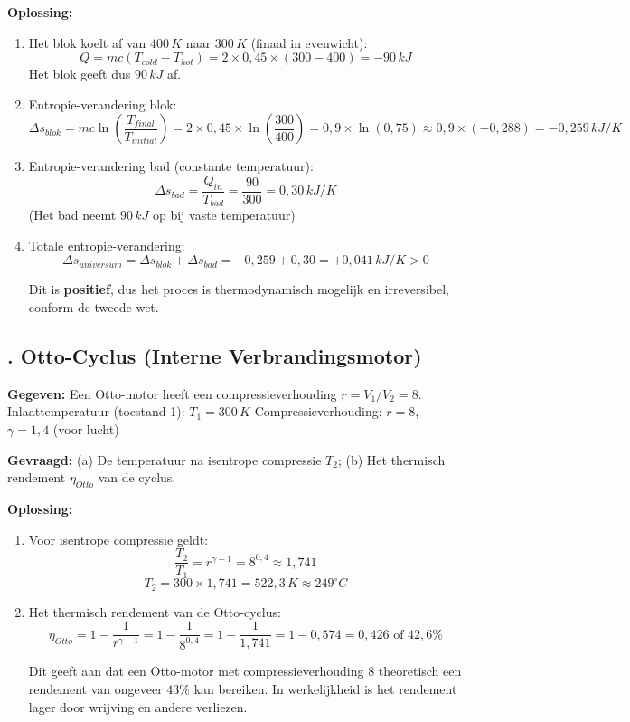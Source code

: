 \documentclass[a4paper,11pt,twoside]{report}
\newcounter{opgave}[section]
\newcommand{\opgave}[1]{%
    \refstepcounter{opgave}%
    \subsection*{\textbf{\arabic{opgave}.} #1}%
}
\begin{document}
\textbf{Oplossing:}
\begin{enumerate}
    \item Het blok koelt af van $400 \, K$ naar $300 \, K$ (finaal in evenwicht):
    \[ Q = m c (T_{cold} - T_{hot}) = 2 \times 0,45 \times (300 - 400) = -90 \, kJ \]
    Het blok geeft dus $90 \, kJ$ af.
    
    \item Entropie-verandering blok:
    \[ \Delta s_{blok} = m c \ln\left(\frac{T_{final}}{T_{initial}}\right) = 2 \times 0,45 \times \ln\left(\frac{300}{400}\right) = 0,9 \times \ln(0,75) \approx 0,9 \times (-0,288) = -0,259 \, kJ/K \]
    
    \item Entropie-verandering bad (constante temperatuur):
    \[ \Delta s_{bad} = \frac{Q_{in}}{T_{bad}} = \frac{90}{300} = 0,30 \, kJ/K \]
    (Het bad neemt $90 \, kJ$ op bij vaste temperatuur)
    
    \item Totale entropie-verandering:
    \[ \Delta s_{universum} = \Delta s_{blok} + \Delta s_{bad} = -0,259 + 0,30 = +0,041 \, kJ/K > 0 \]
    
    Dit is \textbf{positief}, dus het proces is thermodynamisch mogelijk en irreversibel, conform de tweede wet.
\end{enumerate}

\opgave{Otto-Cyclus (Interne Verbrandingsmotor)}
\textbf{Gegeven:}
Een Otto-motor heeft een compressieverhouding $r = V_1/V_2 = 8$.
Inlaattemperatuur (toestand 1): $T_1 = 300 \, K$
Compressieverhouding: $r = 8$, $\gamma = 1,4$ (voor lucht)

\textbf{Gevraagd:}
(a) De temperatuur na isentrope compressie $T_2$; (b) Het thermisch rendement $\eta_{Otto}$ van de cyclus.

\textbf{Oplossing:}
\begin{enumerate}
    \item Voor isentrope compressie geldt:
    \[ \frac{T_2}{T_1} = r^{\gamma - 1} = 8^{0,4} \approx 1,741 \]
    \[ T_2 = 300 \times 1,741 = 522,3 \, K \approx 249^\circ C \]
    
    \item Het thermisch rendement van de Otto-cyclus:
    \[ \eta_{Otto} = 1 - \frac{1}{r^{\gamma-1}} = 1 - \frac{1}{8^{0,4}} = 1 - \frac{1}{1,741} = 1 - 0,574 = 0,426 \text{ of } 42,6\% \]
    
    Dit geeft aan dat een Otto-motor met compressieverhouding $8$ theoretisch een rendement van ongeveer $43\%$ kan bereiken. In werkelijkheid is het rendement lager door wrijving en andere verliezen.
\end{enumerate}
\end{document}
